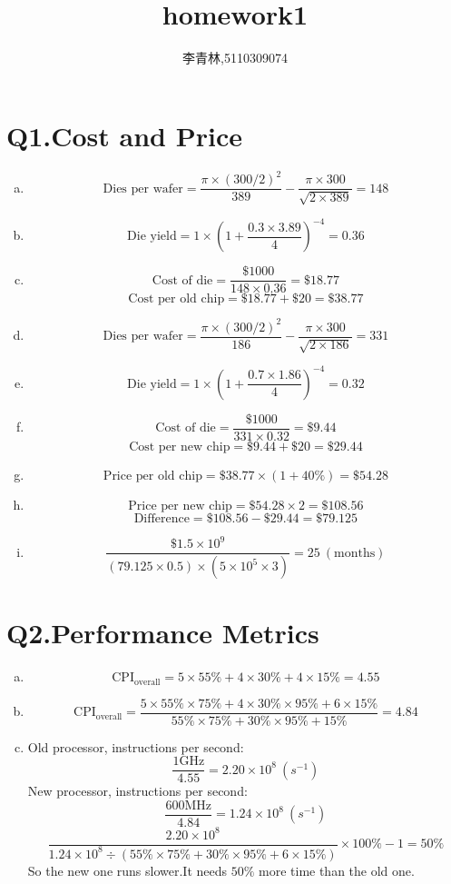 \documentclass[12pt]{article}
\date{}
\title{homework1}
\author{李青林,5110309074}
\begin{document}
\maketitle
\section{Q1.Cost and Price}
\begin{enumerate}[a)]
	\item
	$$\text{Dies per wafer}=\dfrac{\pi\times(300/2)^2}{389}-\dfrac{\pi\times{}300}{\sqrt{2\times{389}}}=148$$
	\item
	$$\text{Die yield}=1\times\left(1+\frac{0.3\times{}3.89}{4}\right)^{-4}=0.36$$
	\item
	$$\text{Cost of die}=\frac{\$1000}{148\times{0.36}}=\$18.77$$
	$$\text{Cost per old chip}=\$18.77+\$20=\$38.77$$
	\item
	$$\text{Dies per wafer}=\dfrac{\pi\times(300/2)^2}{186}-\dfrac{\pi\times{}300}{\sqrt{2\times{186}}}=331$$
	\item
	$$\text{Die yield}=1\times\left(1+\frac{0.7\times{}1.86}{4}\right)^{-4}=0.32$$
	\item
	$$\text{Cost of die}=\frac{\$1000}{331\times{0.32}}=\$9.44$$
	$$\text{Cost per new chip}=\$9.44+\$20=\$29.44$$
	\item
	$$\text{Price per old chip}=\$38.77\times(1+40\%)=\$54.28$$
	\item
	$$\text{Price per new chip}=\$54.28\times{}2=\$108.56$$
	$$\text{Difference}=\$108.56-\$29.44=\$79.125$$
	\item
	$$\frac{\$1.5\times{10^9}}{(79.125\times{}0.5)\times(5\times{}10^5\times3)}=25\ (\text{months})$$
\end{enumerate}

\section{Q2.Performance Metrics}
\begin{enumerate}[a)]
	\item
	$$\text{CPI}_{\text{overall}}=5\times55\%+4\times30\%+4\times15\%=4.55$$
	\item
	$$\text{CPI}_{\text{overall}}=\frac{5\times55\%\times75\%+4\times30\%\times95\%+6\times15\%}{55\%\times75\%+30\%\times95\%+15\%}=4.84$$
	\item
	Old processor, instructions per second:
	$$\frac{1\text{GHz}}{4.55}=2.20\times10^8\ (s^{-1})$$
	New processor, instructions per second:
	$$\frac{600\text{MHz}}{4.84}=1.24\times10^8\ (s^{-1})$$
	$$\frac{2.20\times10^8}{1.24\times10^8\div(55\%\times75\%+30\%\times95\%+6\times15\%)}\times{100\%}-1=50\%$$
	So the new one runs slower.It needs $50\%$ more time than the old one.
\end{enumerate}
\end{document}
